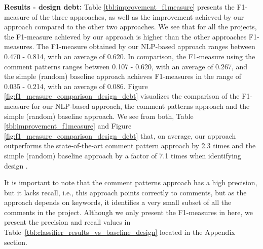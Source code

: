 \vspace{1mm}

\noindent \textbf{Results - design debt:} Table \ref{tbl:improvement_f1measure} presents the F1-measure of the three approaches, as well as the improvement achieved by our approach compared to the other two approaches. We see that for all the projects, the F1-measure achieved by our approach is higher than the other approaches F1-measures. The F1-measure obtained by our NLP-based approach ranges between 0.470 - 0.814, with an average of 0.620. In comparison, the F1-measure using the comment patterns ranges between 0.107 - 0.620, with an average of 0.267, and the simple (random) baseline approach achieves F1-measures in the range of 0.035 - 0.214, with an average of 0.086. Figure \ref{fig:f1_measure_comparison_design_debt} visualizes the comparison of the F1-measure for our NLP-based approach, the comment patterns approach and the simple (random) baseline approach. We see from both, Table \ref{tbl:improvement_f1measure} and Figure \ref{fig:f1_measure_comparison_design_debt} that, on average, our approach outperforms the state-of-the-art comment pattern approach by 2.3 times and the simple (random) baseline approach by a factor of 7.1 times when identifying design \SATD. 

It is important to note that the comment patterns approach has a high precision, but it lacks recall, i.e., this approach points correctly to \SATD comments, but as the approach depends on keywords, it identifies a very small subset of all the \SATD comments in the project. Although we only present the F1-measures in here, we present the precision and recall values in Table~\ref{tbl:classifier_results_vs_baseline_design} located in the Appendix section.  


 

